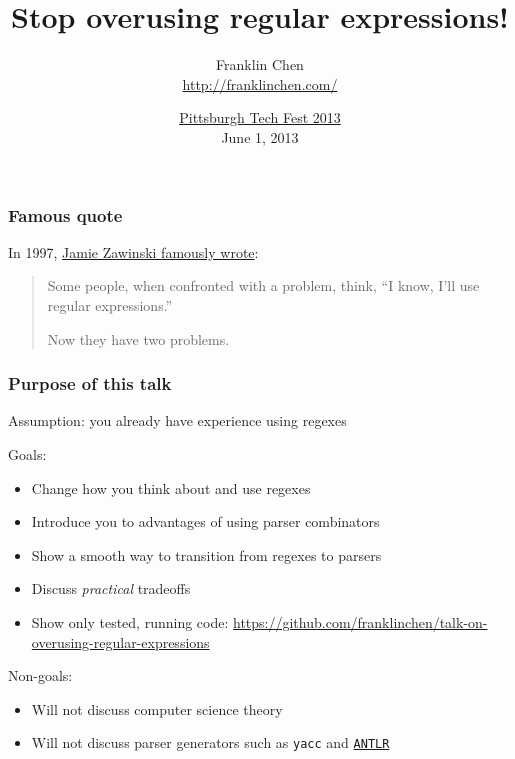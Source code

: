 \usepackage{minted}


\title{Stop overusing regular expressions!}
\author{Franklin Chen \\ \url{http://franklinchen.com/}}
\date{\href{http://www.pghtechfest.com/}{Pittsburgh Tech Fest 2013} \\
June 1, 2013
}



\begin{frame}
  \titlepage
\end{frame}


\begin{frame}
  \frametitle{Famous quote}

  In 1997, \href{http://groups.google.com/forum/?hl=en&fromgroups\#!msg/alt.religion.emacs/DR057Srw5-c/Co-2L2BKn7UJ}{Jamie Zawinski famously wrote}:

  \begin{quotation}
    Some people, when confronted with a problem, think, ``I know, I'll use regular expressions.''

    Now they have two problems.
  \end{quotation}
\end{frame}

\begin{frame}
  \frametitle{Purpose of this talk}

  Assumption: you already have experience using regexes

  Goals:
  \begin{itemize}
    \item Change how you think about and use regexes
    \item Introduce you to advantages of using parser combinators
    \item Show a smooth way to transition from regexes to parsers
    \item Discuss \emph{practical} tradeoffs
    \item Show only tested, running code: \url{https://github.com/franklinchen/talk-on-overusing-regular-expressions}
  \end{itemize}

  Non-goals:
  \begin{itemize}
    \item Will not discuss computer science theory
    \item Will not discuss parser generators such as \texttt{yacc} and \href{http://www.antlr.org/}{\texttt{ANTLR}}
  \end{itemize}
\end{frame}

